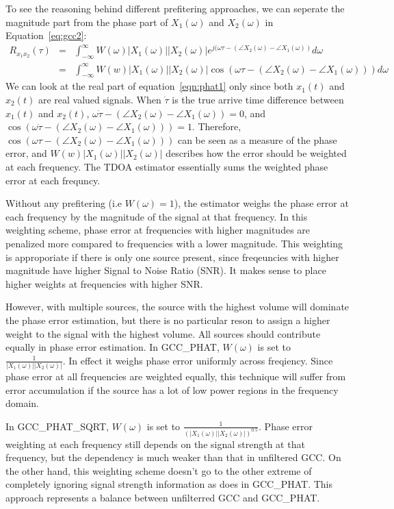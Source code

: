 To see the reasoning behind different prefitering approaches, we can seperate the magnitude part from the phase part of $X_1(\omega)$ and $X_2(\omega)$ in Equation~\ref{eq:gcc2}:
\begin{eqnarray}
\label{eqn:phat1}
R_{x_1x_2}(\tau) &=& \int_{-\infty}^\infty W(\omega) |X_1(\omega)||X_2(\omega)| e^{j(\omega\tau - (\angle{X_2(\omega)} - \angle{X_1(\omega)}) } d\omega\\
&=& \int_{-\infty}^\infty W(w)|X_1(\omega)| |X_2(\omega)| \cos(\omega\tau - (\angle X_2(\omega) - \angle X_1(\omega))) d\omega
\end{eqnarray}
We can look at the real part of equation~\ref{eqn:phat1} only since both $x_1(t)$ and $x_2(t)$ are real valued signals. When $\dot \tau$ is the true arrive time difference between $x_1(t)$ and $x_2(t)$, $\omega \dot \tau - (\angle X_2(\omega) - \angle X_1(\omega)) = 0$, and $\cos(\omega \dot \tau - (\angle X_2(\omega) - \angle X_1(\omega))) = 1$. Therefore, $\cos(\omega\tau - (\angle X_2(\omega) - \angle X_1(\omega)))$ can be seen as a measure of the phase error, and $W(w)|X_1(\omega)||X_2(\omega)|$ describes how the error should be weighted at each frequency. The TDOA estimator essentially sums the weighted phase error at each frequncy. 

Without any prefitering (i.e $W(\omega)=1$), the estimator weighs the phase error at each frequency by the magnitude of the signal at that frequency. In this weighting scheme, phase error at frequencies with higher magnitudes are penalized more compared to frequencies with a lower magnitude. This weighting is approporiate if there is only one source present, since freqeuncies with higher magnitude have higher Signal to Noise Ratio (SNR). It makes sense to place higher weights at frequencies with higher SNR. 

However, with multiple sources, the source with the highest volume will dominate the phase error estimation, but there is no particular reson to assign a higher weight to the signal with the highest volume. All sources should contribute equally in phase error estimation. In GCC\_PHAT,  $W(\omega)$ is set to $\frac{1}{|X_1(\omega)||X_2(\omega)|}$. In effect it weighs phase error uniformly across freqiency. Since phase error at all frequencies are weighted equally, this technique will suffer from error accumulation if the source has a lot of low power regions in the frequency domain.

In GCC\_PHAT\_SQRT, $W(\omega)$ is set to $\frac{1}{(|X_1(\omega)||X_2(\omega)|)^{0.5}}$. Phase error weighting at each frequency still depends on the signal strength at that frequency, but the dependency is much weaker than that in unfiltered GCC. On the other hand, this weighting scheme doesn't go to the other extreme of completely ignoring signal strength information as does in GCC\_PHAT. This approach represents a balance between unfilterred GCC and GCC\_PHAT.
